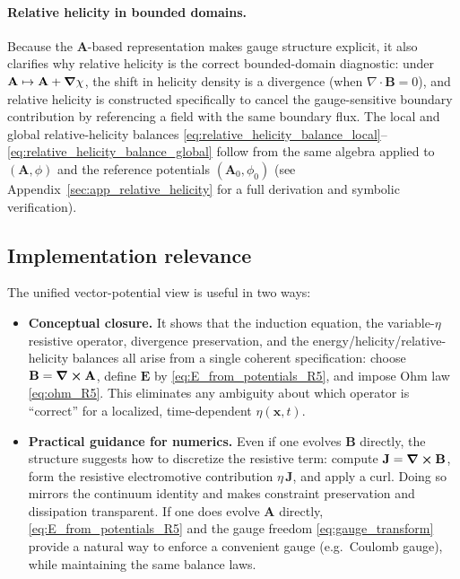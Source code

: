 \documentclass[11pt]{article}
\theoremstyle{plain}
\theoremstyle{definition}
\theoremstyle{remark}
\newcommand{\diver}{\nabla\cdot}
\newcommand{\A}{\mathbf{A}}
\newcommand{\B}{\mathbf{B}}
\newcommand{\E}{\mathbf{E}}
\newcommand{\J}{\mathbf{J}}
\begin{document}
\paragraph{Relative helicity in bounded domains.}
Because the $\A$-based representation makes gauge structure explicit, it also clarifies why relative
helicity is the correct bounded-domain diagnostic: under $\A\mapsto\A+\grad\chi$, the shift in helicity
density is a divergence (when $\diver\B=0$), and relative helicity is constructed specifically to cancel
the gauge-sensitive boundary contribution by referencing a field with the same boundary flux. The local
and global relative-helicity balances \eqref{eq:relative_helicity_balance_local}--\eqref{eq:relative_helicity_balance_global}
follow from the same algebra applied to $(\A,\phi)$ and the reference potentials $(\A_0,\phi_0)$ (see
Appendix~\ref{sec:app_relative_helicity} for a full derivation and symbolic verification).

\subsection{Implementation relevance}\label{sec:result_Aform_impl}
The unified vector-potential view is useful in two ways:

\begin{itemize}[leftmargin=*]
  \item \textbf{Conceptual closure.}
  It shows that the induction equation, the variable-$\eta$ resistive operator, divergence preservation,
  and the energy/helicity/relative-helicity balances all arise from a single coherent specification:
  choose $\B=\curl\A$, define $\E$ by \eqref{eq:E_from_potentials_R5}, and impose Ohm law
  \eqref{eq:ohm_R5}. This eliminates any ambiguity about which operator is ``correct'' for a localized,
  time-dependent $\eta(\mathbf{x},t)$.

  \item \textbf{Practical guidance for numerics.}
  Even if one evolves $\B$ directly, the structure suggests how to discretize the resistive term:
  compute $\J=\curl\B$, form the resistive electromotive contribution $\eta\,\J$, and apply a curl.
  Doing so mirrors the continuum identity and makes constraint preservation and dissipation transparent.
  If one does evolve $\A$ directly, \eqref{eq:E_from_potentials_R5} and the gauge freedom
  \eqref{eq:gauge_transform} provide a natural way to enforce a convenient gauge (e.g.\ Coulomb gauge),
  while maintaining the same balance laws.

\end{itemize}
\end{document}
